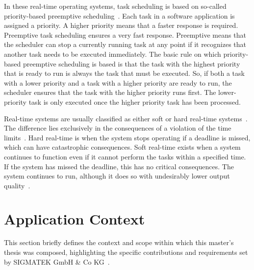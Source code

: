 \documentclass[MMR,Master,english]{style/twbook}
\begin{document}
\noindent In these real-time operating systems, task scheduling is based on so-called priority-based preemptive scheduling~\cite{buttazzoHardRealtimeComputing2024}. Each task in a software application is assigned a priority. A higher priority means that a faster response is required. Preemptive task scheduling ensures a very fast response. Preemptive means that the scheduler can stop a currently running task at any point if it recognizes that another task needs to be executed immediately. The basic rule on which priority-based preemptive scheduling is based is that the task with the highest priority that is ready to run is always the task that must be executed. So, if both a task with a lower priority and a task with a higher priority are ready to run, the scheduler ensures that the task with the higher priority runs first. The lower-priority task is only executed once the higher priority task has been processed.

\bigskip \noindent Real-time systems are usually classified as either soft or hard real-time systems~\cite{lipariRealTimeSchedulingHard2015}. The difference lies exclusively in the consequences of a violation of the time limits~\cite{amarpreetHardRealTime2009}. Hard real-time is when the system stops operating if a deadline is missed, which can have catastrophic consequences. Soft real-time exists when a system continues to function even if it cannot perform the tasks within a specified time. If the system has missed the deadline, this has no critical consequences. The system continues to run, although it does so with undesirably lower output quality~\cite{queirozTestingLimitsGeneralpurpose2023}.

\section{Application Context}\label{sec:application_context}
This section briefly defines the context and scope within which this master's thesis was composed, highlighting the specific contributions and requirements set by SIGMATEK GmbH \& Co KG~\cite{pixelartSIGMATEKKompletteAutomatisierungssysteme}.
\end{document}
